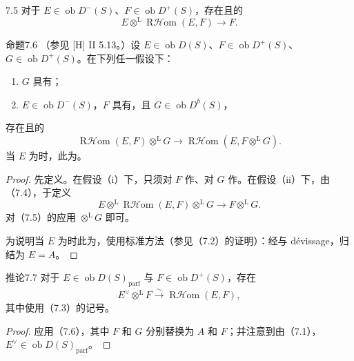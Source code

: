 \begin{SGAresult}{}{7.5}
对于 $E\in\operatorname{ob}D^-(S)$、$F\in\operatorname{ob}D^+(S)$，存在且的
\[E\otimes^{\mathrm L}\operatorname{R\mathcal Hom}(E,F)\longrightarrow F.\]
\end{SGAresult}

\begin{SGAresult}{命题}{7.6}
（参见 [H] II 5.13。）设 $E\in\operatorname{ob}D(S)$、$F\in\operatorname{ob}D^+(S)$、$G\in\operatorname{ob}D^+(S)$。在下列任一假设下：
\begin{enumerate}
\item[(i)] $G$ 具有；
\item[(ii)] $E\in\operatorname{ob}D^-(S)$，$F$ 具有，且 $G\in\operatorname{ob}D^b(S)$，
\end{enumerate}
存在且的
\[\operatorname{R\mathcal Hom}(E,F)\otimes^{\mathrm L}G\longrightarrow\operatorname{R\mathcal Hom}(E,F\otimes^{\mathrm L}G).\]
当 $E$ 为时，此为。
\end{SGAresult}
\begin{proof}
先定义。在假设（i）下，只须对 $F$ 作、对 $G$ 作。在假设（ii）下，由（7.4），于定义
\[E\otimes^{\mathrm L}\operatorname{R\mathcal Hom}(E,F)\otimes^{\mathrm L}G\longrightarrow F\otimes^{\mathrm L}G.\]
对（7.5）的应用 $\mathbin{\otimes^{\mathrm L}}G$ 即可。

为说明当 $E$ 为时此为，使用标准方法（参见（7.2）的证明）：经与 dévissage，归结为 $E=A$。
\end{proof}

\begin{SGAresult}{推论}{7.7}
对于 $E\in\operatorname{ob}D(S)_{\underline{\mathrm{parf}}}$ 与 $F\in\operatorname{ob}D^+(S)$，存在
\[E^\vee\otimes^{\mathrm L}F\xrightarrow{\sim}\operatorname{R\mathcal Hom}(E,F),\]
其中使用（7.3）的记号。
\end{SGAresult}
\begin{proof}
应用（7.6），其中 $F$ 和 $G$ 分别替换为 $A$ 和 $F$；并注意到由（7.1），$E^\vee\in\operatorname{ob}D(S)_{\underline{\mathrm{parf}}}$。
\end{proof}

